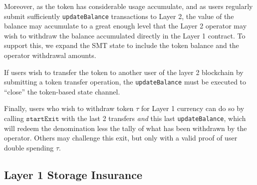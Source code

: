 \documentclass{article}
\newcommand{\startexit}{\texttt{startExit}}
\begin{document}
Moreover, as the token has considerable usage accumulate, and as users regularly submit sufficiently \texttt{updateBalance} transactions to Layer 2, the value of the balance may accumulate to a great enough level that the Layer 2 operator may wish to withdraw the balance accumulated directly in the Layer 1 contract.   To support this, we expand the SMT state to include the token balance and the operator withdrawal amounts.

If users wish to transfer the token to another user of the layer 2 blockchain by submitting a token transfer operation, the \texttt{updateBalance} must be executed to ``close'' the token-based state channel.

Finally, users who wish to withdraw token $\tau$ for Layer 1 currency can do so by calling $\startexit$ with the last 2 transfers {\em and} this last \texttt{updateBalance}, which will redeem the denomination less the tally of what has been withdrawn by the operator.  Others may challenge this exit, but only with a valid proof of user double spending $\tau$.

\subsection{Layer 1 Storage Insurance}
\end{document}
